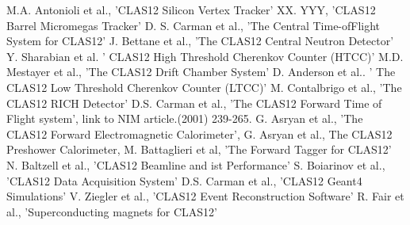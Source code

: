 \documentclass[final,3p,times,twocolumn,authoryear]{elsarticle}
\begin{document}
\begin{thebibliography}{99}
 M.A. Antonioli et al., 'CLAS12 Silicon Vertex Tracker' 
 XX. YYY, 'CLAS12 Barrel Micromegas Tracker' 
 D. S. Carman et al., 'The Central Time-ofFlight System for CLAS12' 
 J. Bettane et al., 'The CLAS12 Central Neutron Detector'
 Y. Sharabian et al.  ' CLAS12 High Threshold Cherenkov Counter (HTCC)' 
 M.D. Mestayer et al., 'The CLAS12 Drift Chamber System'
 D. Anderson et al.. ' The CLAS12 Low Threshold Cherenkov Counter (LTCC)' 
 M. Contalbrigo et al., 'The CLAS12 RICH Detector'  
 D.S. Carman et al., 'The CLAS12 Forward Time of Flight system', link to NIM article.(2001) 239-265.
 G. Asryan et al., 'The CLAS12 Forward Electromagnetic Calorimeter', 
 G. Asryan et al.,  The CLAS12 Preshower Calorimeter,
 M. Battaglieri et al, 'The Forward Tagger for CLAS12' 
 N. Baltzell et al., 'CLAS12 Beamline and ist Performance' 
 S. Boiarinov et al., 'CLAS12 Data Acquisition System' 
 D.S. Carman et al., 'CLAS12 Geant4 Simulations' 
 V. Ziegler et al., 'CLAS12 Event Reconstruction Software' 
 R. Fair et al., 'Superconducting magnets for CLAS12'
\end{thebibliography}

\end{document}
